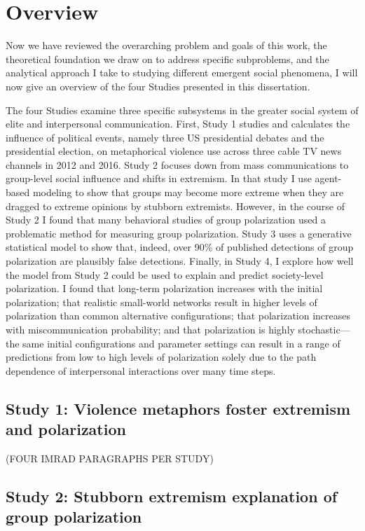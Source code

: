\documentclass[12pt,letterpaper]{article}
\begin{document}
\section{Overview}

Now we have reviewed the overarching problem and goals of this work, the
theoretical foundation we draw on to address specific subproblems, and
the analytical approach I take to studying different emergent social
phenomena, I will now give an overview of the four Studies presented in this
dissertation.

The four Studies examine three specific subsystems in the greater social system
of elite and interpersonal communication. First, Study 1 studies and 
calculates the influence of political events, namely three US presidential
debates and the presidential election, on metaphorical violence use across
three cable TV news channels in 2012 and 2016. Study 2 focuses down from
mass communications to group-level social influence and shifts in extremism.
In that study I use agent-based modeling to show that groups may become 
more extreme when they are dragged to extreme opinions by stubborn extremists.
However, in the course of Study 2 I found that many behavioral studies of
group polarization used a problematic method for measuring group polarization.
Study 3 uses a generative statistical model to show that, indeed, over 90\% of published detections of group polarization
are plausibly false detections. Finally, in Study 4, I explore how well the
model from Study 2 could be used to explain and predict society-level
polarization. I found that long-term polarization increases with the initial
polarization; that realistic small-world networks result in higher levels of
polarization than common alternative configurations; that polarization
increases with miscommunication probability; and that
polarization is highly stochastic---the same initial configurations and
parameter settings can result in a range of predictions from low to high
levels of polarization solely due to the path dependence of interpersonal
interactions over many time steps.


\subsection{Study 1: Violence metaphors foster extremism and polarization}

(FOUR IMRAD PARAGRAPHS PER STUDY)

\subsection{Study 2: Stubborn extremism explanation of group polarization}
\end{document}
